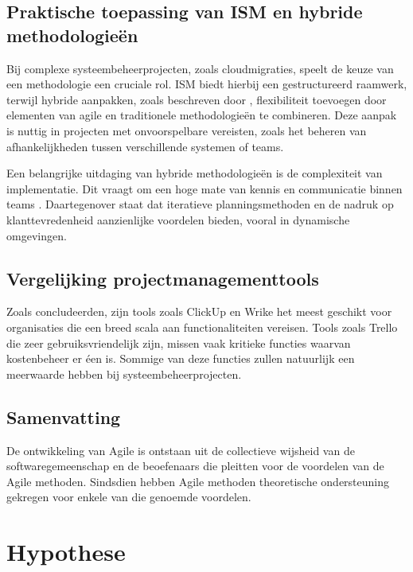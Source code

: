 \documentclass{article}
\begin{document}
    \subsection{Praktische toepassing van ISM en hybride methodologieën}

    Bij complexe systeembeheerprojecten, zoals cloudmigraties, speelt de keuze van een methodologie een cruciale rol. 
    ISM biedt hierbij een gestructureerd raamwerk, terwijl hybride aanpakken, zoals beschreven door \textcite{reiff2022hybrid}, flexibiliteit toevoegen door elementen van agile en traditionele methodologieën te combineren. 
    Deze aanpak is nuttig in projecten met onvoorspelbare vereisten, zoals het beheren van afhankelijkheden tussen verschillende systemen of teams. \newline

    Een belangrijke uitdaging van hybride methodologieën is de complexiteit van implementatie. 
    Dit vraagt om een hoge mate van kennis en communicatie binnen teams \autocite{reiff2022hybrid}. 
    Daartegenover staat dat iteratieve planningsmethoden en de nadruk op klanttevredenheid aanzienlijke voordelen bieden, vooral in dynamische omgevingen.

    \subsection{Vergelijking projectmanagementtools}

    Zoals \textcite{pasaric2022comparison} concludeerden, zijn tools zoals ClickUp en Wrike het meest geschikt voor organisaties die een breed scala aan functionaliteiten vereisen. 
    Tools zoals Trello die zeer gebruiksvriendelijk zijn, missen vaak kritieke functies waarvan kostenbeheer er éen is. 
    Sommige van deze functies zullen natuurlijk een meerwaarde hebben bij systeembeheerprojecten.

    \subsection{Samenvatting}

    De ontwikkeling van Agile is ontstaan uit de collectieve wijsheid van de softwaregemeenschap en de beoefenaars die pleitten voor de voordelen van de Agile methoden. 
    Sindsdien hebben Agile methoden theoretische ondersteuning gekregen voor enkele van die genoemde voordelen. \autocite{STRAY2022107058}

    \section{Hypothese}
\end{document}

